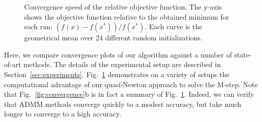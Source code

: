 \begin{figure}[htb]
    \centering
    \vspace{-5pt}
    \caption[Convergence speed of the relative objective function.]{Convergence speed of the relative objective function. The y-axis shows the objective function relative to the obtained minimum for each run: $(f(x) - f(x^*))/f(x^*)$. Each curve is the geometrical mean over 24 different random initializations.}
    \label{fig:convergence_setups}
\end{figure}

Here, we compare convergence plots of our algorithm against a number of state-of-art methods. The details of the experimental setup are described in Section~\ref{sec:experiments}. Fig.~\ref{fig:convergence_setups} demonstrates on a variety of setups the computational
advantage of our quasi-Newton approach to solve the M-step.
Note that Fig.~\ref{fig:convergence}b is in fact a summary of Fig.~\ref{fig:convergence_setups}. 
Indeed, we can verify that ADMM methods converge quickly to a modest accuracy, but take much longer to converge to a high accuracy.\citep{boyd2011distributed}

